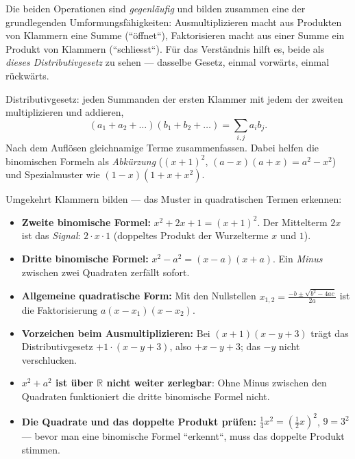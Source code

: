 


Die beiden Operationen sind \emph{gegenläufig} und bilden zusammen eine
der grundlegenden Umformungsfähigkeiten: Ausmultiplizieren macht aus
Produkten von Klammern eine Summe (``öffnet``), Faktorisieren macht aus
einer Summe ein Produkt von Klammern (``schliesst``). Für das
Verständnis hilft es, beide als \emph{dieses Distributivgesetz} zu sehen
--- dasselbe Gesetz, einmal vorwärts, einmal rückwärts.

\begin{werkzeugkasten}[Ausmultiplizieren]
Distributivgesetz: jeden Summanden der ersten Klammer mit jedem der
zweiten multiplizieren und addieren,
\begin{equation}
  (a_1+a_2+\dots)(b_1+b_2+\dots)=\sum_{i,j} a_i b_j .
\end{equation}
Nach dem Auflösen gleichnamige Terme zusammenfassen. Dabei helfen die
binomischen Formeln als \emph{Abkürzung} ($(x+1)^2$, $(a-x)(a+x)=a^2-x^2$)
und Spezialmuster wie $(1-x)(1+x+x^2)$.
\end{werkzeugkasten}

\begin{werkzeugkasten}
Umgekehrt Klammern bilden --- das Muster in quadratischen Termen
erkennen:
\begin{itemize}
  \item \textbf{Zweite binomische Formel:} $x^2+2x+1=(x+1)^2$.
        Der Mittelterm $2x$ ist das \emph{Signal}: $2\cdot x\cdot1$
        (doppeltes Produkt der Wurzelterme $x$ und $1$).
  \item \textbf{Dritte binomische Formel:} $x^2-a^2=(x-a)(x+a)$.
        Ein \emph{Minus} zwischen zwei Quadraten zerfällt sofort.
  \item \textbf{Allgemeine quadratische Form:} Mit den Nullstellen
        $x_{1,2}=\frac{-b\pm\sqrt{b^2-4ac}}{2a}$ ist die Faktorisierung
        $a(x-x_1)(x-x_2)$.
\end{itemize}
\end{werkzeugkasten}

\begin{achtung}
\begin{itemize}
  \item \textbf{Vorzeichen beim Ausmultiplizieren:} Bei
        $(x+1)(x-y+3)$ trägt das Distributivgesetz $+1\cdot(x-y+3)$, also
        $+x-y+3$; das $-y$ nicht verschlucken.
  \item \textbf{$x^2+a^2$ ist über $\mathbb R$ nicht weiter zerlegbar}:
        Ohne Minus zwischen den Quadraten funktioniert die dritte
        binomische Formel nicht.
  \item \textbf{Die Quadrate und das doppelte Produkt prüfen:}
        $\tfrac14x^2=(\tfrac12x)^2$, $9=3^2$ --- bevor man eine binomische
        Formel ``erkennt``, muss das doppelte Produkt stimmen.
\end{itemize}
\end{achtung}
